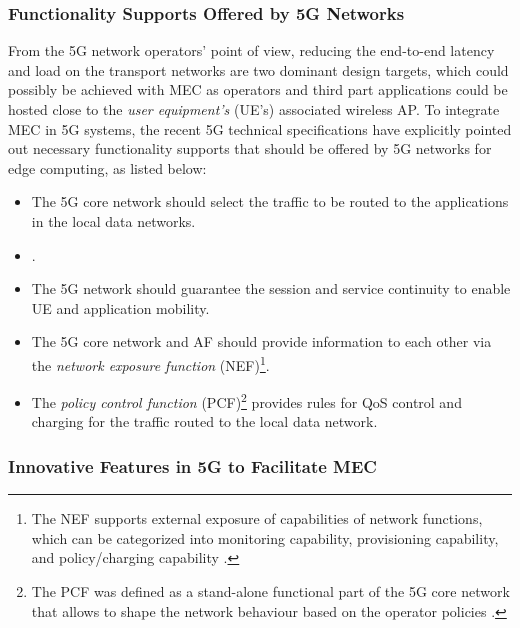 \documentclass[journal]{IEEEtran}
\begin{document}
{{\subsubsection{Functionality Supports Offered by 5G Networks} From the 5G network operators' point of view, reducing the end-to-end latency and load on the transport networks are two dominant design targets, which could possibly be achieved with MEC as operators and third part applications could be hosted close to the \emph{user equipment's} (UE's) associated wireless AP. To integrate MEC in 5G systems, the recent 5G technical specifications have explicitly pointed out  necessary functionality supports that should be offered by 5G networks for edge computing, as listed below:
\begin{itemize}
\item The 5G core network should select the traffic to be routed to the applications in the local data networks.

\item {}.

\item The 5G network should guarantee the session and service continuity to enable UE and application mobility.

\item The 5G core network and AF should provide information to each other via the \emph{network exposure function} (NEF)\footnote{\color{black}The NEF supports external exposure of capabilities of network functions, which can be categorized into monitoring capability, provisioning capability, and policy/charging capability \cite{3GPPTS23501}.}.

\item The \emph{policy control function} (PCF)\footnote{\color{black}The PCF was defined as a stand-alone functional part of the 5G core network that allows to shape the network behaviour based on the operator policies \cite{PCF5G}.} provides rules for QoS control and charging for the traffic routed to the local data network.
\end{itemize}

\subsubsection{Innovative Features in 5G to Facilitate MEC}

}}
\end{document}
